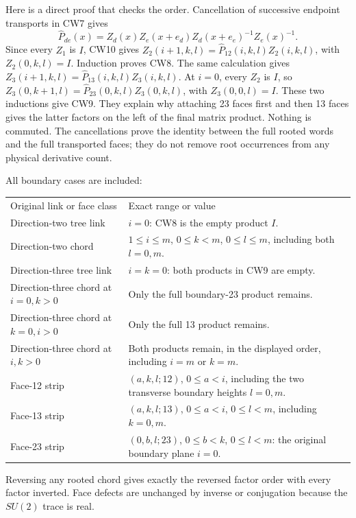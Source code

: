 \documentclass[11pt]{article}
\begin{document}
Here is a direct proof that checks the order. Cancellation of
successive endpoint transports in CW7 gives
\[
 \widehat P_{de}(x)=
 Z_d(x)Z_e(x+e_d)Z_d(x+e_e)^{-1}Z_e(x)^{-1}.               \tag{CW10}
\]
Since every \(Z_1\) is \(I\), CW10 gives
\(Z_2(i+1,k,l)=\widehat P_{12}(i,k,l)Z_2(i,k,l)\), with
\(Z_2(0,k,l)=I\). Induction proves CW8. The same calculation
gives \(Z_3(i+1,k,l)=\widehat P_{13}(i,k,l)Z_3(i,k,l)\).
At \(i=0\), every \(Z_2\) is \(I\), so
\(Z_3(0,k+1,l)=\widehat P_{23}(0,k,l)Z_3(0,k,l)\), with
\(Z_3(0,0,l)=I\). These two inductions give CW9. They explain
why attaching 23 faces first and then 13 faces gives the latter
factors on the left of the final matrix product. Nothing is
commuted. The cancellations prove the identity between the full
rooted words and the full transported faces; they do not remove
root occurrences from any physical derivative count.

All boundary cases are included:

\begingroup\small\setlength{\tabcolsep}{3pt}\begin{longtable}{@{}p{}p{}@{}}\toprule
Original link or face class & Exact range or value\\
Direction-two tree link & \(i=0\): CW8 is the empty product \(I\).\\
Direction-two chord & \(1\le i\le m\), \(0\le k<m\), \(0\le l\le m\), including both \(l=0,m\).\\
Direction-three tree link & \(i=k=0\): both products in CW9 are empty.\\
Direction-three chord at \(i=0,k>0\) & Only the full boundary-23 product remains.\\
Direction-three chord at \(k=0,i>0\) & Only the full 13 product remains.\\
Direction-three chord at \(i,k>0\) & Both products remain, in the displayed order, including \(i=m\) or \(k=m\).\\
Face-12 strip & \((a,k,l;12)\), \(0\le a<i\), including the two transverse boundary heights \(l=0,m\).\\
Face-13 strip & \((a,k,l;13)\), \(0\le a<i\), \(0\le l<m\), including \(k=0,m\).\\
Face-23 strip & \((0,b,l;23)\), \(0\le b<k\), \(0\le l<m\): the original boundary plane \(i=0\).\\
\bottomrule\end{longtable}\endgroup

Reversing any rooted chord gives exactly the reversed factor
order with every factor inverted. Face defects are unchanged
by inverse or conjugation because the \(SU(2)\) trace is real.
\end{document}
